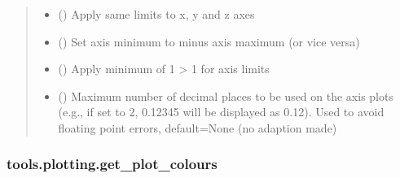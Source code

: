 \documentclass[letterpaper,10pt,english]{sphinxmanual}
\begin{document}
\begin{fulllineitems}
\begin{quote}
\begin{description}
\begin{itemize}
\item {} 
\sphinxAtStartPar
{} (\sphinxstyleliteralemphasis{\sphinxupquote{, }}) \textendash{} Apply same limits to x, y and z axes

\item {} 
\sphinxAtStartPar
{} (\sphinxstyleliteralemphasis{\sphinxupquote{, }}) \textendash{} Set axis minimum to minus axis maximum (or vice versa)

\item {} 
\sphinxAtStartPar
{} (\sphinxstyleliteralemphasis{\sphinxupquote{, }}) \textendash{} Apply minimum of \sphinxhyphen{}1 \sphinxhyphen{}\textgreater{} 1 for axis limits

\item {} 
\sphinxAtStartPar
{} (\sphinxstyleliteralemphasis{\sphinxupquote{, }}) \textendash{} Maximum number of decimal places to be used on the axis plots (e.g., if set to 2, 0.12345 will be displayed
as 0.12). Used to avoid floating point errors, default=None (no adaption made)

\end{itemize}

\end{description}\end{quote}

\end{fulllineitems}



\subsubsection{tools.plotting.get\_plot\_colours}
\label{\detokenize{_autosummary/tools.plotting.get_plot_colours:tools-plotting-get-plot-colours}}\label{\detokenize{_autosummary/tools.plotting.get_plot_colours::doc}}
\end{document}
